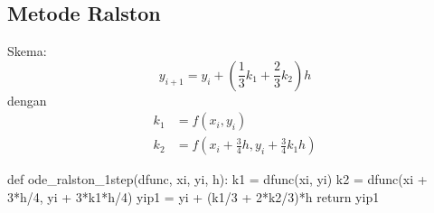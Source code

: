 \subsection{Metode Ralston}

Skema:
\begin{equation*}
y_{i+1} = y_i + \left( \frac{1}{3}k_1 + \frac{2}{3}k_2 \right) h
\end{equation*}
dengan
\begin{align*}
k_1 & = f(x_i, y_i) \\
k_2 & = f\left( x_i + \frac{3}{4}h, y_i + \frac{3}{4}k_1 h \right)
\end{align*}

\begin{pythoncode}
def ode_ralston_1step(dfunc, xi, yi, h):
    k1 = dfunc(xi, yi)
    k2 = dfunc(xi + 3*h/4, yi + 3*k1*h/4)
    yip1 = yi + (k1/3 + 2*k2/3)*h
    return yip1
\end{pythoncode}

